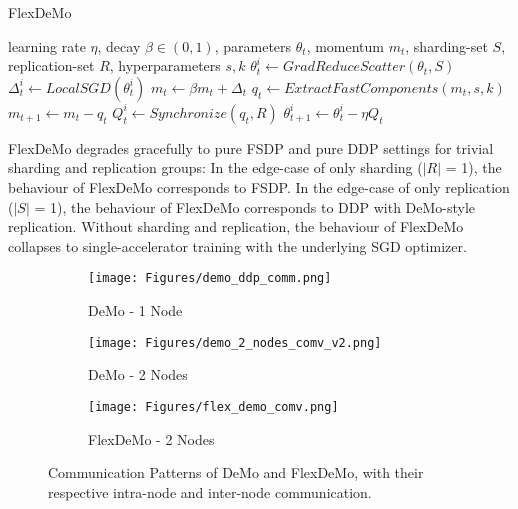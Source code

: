 \renewcommand{\algorithmicrequire}{\textbf{Input:}}
\renewcommand{\algorithmicensure}{\textbf{Output:}}
\begin{algorithm}
\caption{FlexDeMo}\label{alg:denotation}
    \begin{algorithmic}
        \Require learning rate $\eta$, decay $\beta \in (0,1)$, parameters $\theta_t$, momentum $m_t$,
        \Require sharding-set $S$, replication-set $R$, hyperparameters $s, k$
        \State $\theta_t^i \leftarrow GradReduceScatter(\theta_t, S)$ 
        \State $\Delta_t^i \leftarrow LocalSGD(\theta_t^i )$ 
        \State $m_t \leftarrow \beta m_t + \Delta_t$ 
        \State $q_t \leftarrow  ExtractFastComponents(m_t, s, k)$  
        \State $m_{t+1} \leftarrow m_t - q_t$ 
        \State $Q_t^i \leftarrow Synchronize(q_t, R)$ 
        \State $\theta_{t+1}^i \leftarrow \theta_t^i - \eta Q_t$ 
    \end{algorithmic}
    \label{alg:flexdemo}
\end{algorithm}



FlexDeMo degrades gracefully to pure FSDP and pure DDP settings for trivial sharding and replication groups: In the edge-case of only sharding ($\left|R\right|$ = 1), the behaviour of FlexDeMo corresponds to FSDP. In the edge-case of only replication ($\left|S\right|$ = 1), the behaviour of FlexDeMo corresponds to DDP with DeMo-style replication. Without sharding and replication, the behaviour of FlexDeMo collapses to single-accelerator training with the underlying SGD optimizer.


\begin{figure*}[ht]
    \centering
    \begin{subfigure}[b]{0.31\textwidth}
        \centering
         \texttt{[image: Figures/demo\_ddp\_comm.png]}
        \caption{DeMo - 1 Node}
        \label{fig:DeMo_communication_pattern_1_node}
    \end{subfigure}
    \hfill
    \begin{subfigure}[b]{0.64\textwidth}
        \centering
        \texttt{[image: Figures/demo\_2\_nodes\_comv\_v2.png]}
        \caption{DeMo - 2 Nodes}
        \label{fig:DeMo_communication_pattern_2_nodes}
    \end{subfigure}
    \vspace{2em}
    \centering
    \begin{subfigure}[b]{0.7\textwidth}
        \centering
        \texttt{[image: Figures/flex\_demo\_comv.png]}
        \caption{FlexDeMo - 2 Nodes}
        \label{fig:flexDeMo_communication_pattern}
    \end{subfigure}
    \caption{
    Communication Patterns of DeMo and FlexDeMo, with their respective intra-node and inter-node communication.
    }
\end{figure*}


